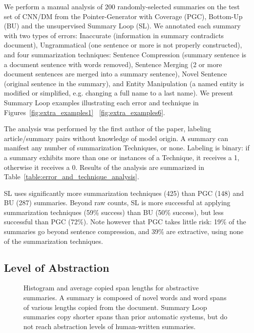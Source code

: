 \documentclass[11pt,a4paper]{article}
\begin{document}
We perform a manual analysis of 200 randomly-selected summaries on the test set of CNN/DM from the Pointer-Generator with Coverage (PGC), Bottom-Up (BU) and the unsupervised Summary Loop (SL). We annotated each summary with two types of errors: Inaccurate (information in summary contradicts document), Ungrammatical (one sentence or more is not properly constructed), and four summarization techniques: Sentence Compression (summary sentence is a document sentence with words removed), Sentence Merging (2 or more document sentences are merged into a summary sentence), Novel Sentence (original sentence in the summary), and Entity Manipulation (a named entity is modified or simplified, e.g. changing a full name to a last name). We present Summary Loop examples illustrating each error and technique in Figures~\ref{fig:extra_examples1} \textendash~\ref{fig:extra_examples6}.

The analysis was performed by the first author of the paper, labeling article/summary pairs without knowledge of model origin. A summary can manifest any number of summarization Techniques, or none. Labeling is binary: if a summary exhibits more than one or instances of a Technique, it receives a 1, otherwise it receives a 0. Results of the analysis are summarized in Table~\ref{table:error_and_technique_analysis}.

SL uses significantly more summarization techniques (425) than PGC (148) and BU (287) summaries. Beyond raw counts, SL is more successful at applying summarization techniques (59\% success) than BU (50\% success), but less successful than PGC (72\%). Note however that PGC takes little risk: 19\% of the summaries go beyond sentence compression, and 39\% are extractive, using none of the summarization techniques.

\subsection{Level of Abstraction}
\begin{figure}[t]
    \centering
    
    \caption{Histogram and average copied span lengths for abstractive summaries. A summary is composed of novel words and word spans of various lengths copied from the document. Summary Loop summaries copy shorter spans than prior automatic systems, but do not reach abstraction levels of human-written summaries.}
    \label{table:abstraction_analysis}
\end{figure}
\end{document}
